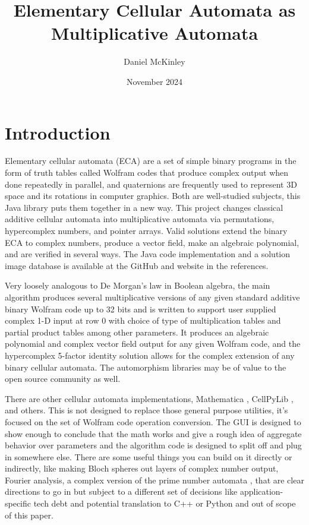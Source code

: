 \documentclass[11pt]{article}
\title{Elementary Cellular Automata as Multiplicative Automata}
\date{November 2024}
\author{Daniel McKinley}
\begin{document}
\maketitle


\section{Introduction}

Elementary cellular automata (ECA) are a set of simple binary programs in the form of truth tables called Wolfram codes that produce complex output when done repeatedly in parallel, and quaternions are frequently used to represent 3D space and its rotations in computer graphics. Both are well-studied subjects, this Java library puts them together in a new way. This project changes classical additive cellular automata into multiplicative automata \cite{Wolfram} via permutations, hypercomplex numbers, and pointer arrays. Valid solutions extend the binary ECA to complex numbers, produce a vector field, make an algebraic polynomial, and are verified in several ways. The Java code implementation \cite{mygit} and a solution image database \cite{dmwebsite} is available at the GitHub and website in the references.

 Very loosely analogous to De Morgan's law in Boolean algebra, the main algorithm produces several multiplicative versions of any given standard additive binary Wolfram code up to 32 bits and is written to support user supplied complex 1-D input at row 0 with choice of type of multiplication tables and partial product tables among other parameters. It produces an algebraic polynomial and complex vector field output for any given Wolfram code, and the hypercomplex 5-factor identity solution allows for the complex extension of any binary cellular automata.  The automorphism libraries may be of value to the open source community as well. 

There are other cellular automata implementations, Mathematica \cite{Mathematica}, CellPyLib \cite{Antunes2021}, and others. This is not designed to replace those general purpose utilities, it's focused on the set of Wolfram code operation conversion. The GUI is designed to show enough to conclude that the math works and give a rough idea of aggregate behavior over parameters and the algorithm code is designed to split off and plug in somewhere else. There are some useful things you can build on it directly or indirectly, like making Bloch spheres out layers of complex number output, Fourier analysis, a complex version of the prime number automata \cite{Wolfram}, that are clear directions to go in but subject to a different set of decisions like application-specific tech debt and potential translation to C++ or Python and out of scope of this paper.
\end{document}
